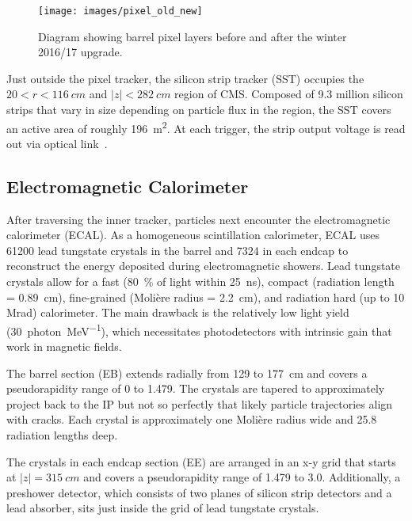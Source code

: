 \documentclass[12pt]{article}
\begin{document}
        \noindent \begin{figure}[htbp] \begin{center}
            \texttt{[image: images/pixel\_old\_new]}
            \caption{Diagram showing barrel pixel layers before and after the winter 2016/17 upgrade.~\cite{pixel_old_new}}
            \label{pixel_old_new}
        \end{center} \end{figure}
        
        Just outside the pixel tracker, the silicon strip tracker (SST) occupies the $\num{20} < r < \SI{116}{cm}$ and $\lvert z \rvert < \SI{282}{cm}$ region of CMS. Composed of \num{9.3} million silicon strips that vary in size  depending on particle flux in the region, the SST covers an active area of roughly \SI{196}{m^2}. At each trigger, the strip output voltage is read out via optical link~\cite{cms_pixel_upgrade}.

    \subsection{Electromagnetic Calorimeter}
        After traversing the inner tracker, particles next encounter the electromagnetic calorimeter (ECAL). As a homogeneous scintillation calorimeter, ECAL uses \num{61200} lead tungstate crystals in the barrel and \num{7324} in each endcap to reconstruct the energy deposited during electromagnetic showers. Lead tungstate crystals allow for a fast (\SI{80}{\percent} of light within \SI{25}{\nano\s}), compact (radiation length = \SI{0.89}{cm}), fine-grained (Moli\`ere radius = \SI{2.2}{cm}), and radiation hard (up to 10 Mrad) calorimeter. The main drawback is the relatively low light yield (\SI{30}{photon\per\mega\electronvolt}), which necessitates photodetectors with intrinsic gain that work in magnetic fields\cite{cms_experiment, cms_tdr}.

        The barrel section (EB) extends radially from \num{129} to \SI{177}{cm} and covers a pseudorapidity range of \num{0} to \num{1.479}. The crystals are tapered to approximately project back to the IP but not so perfectly that likely particle trajectories align with cracks. Each crystal is approximately one Moli\`ere radius wide and 25.8 radiation lengths deep.

        The crystals in each endcap section (EE) are arranged in an x-y grid that starts at $\lvert z \rvert = \SI{315}{cm}$ and covers a pseudorapidity range of \num{1.479} to \num{3.0}. Additionally, a preshower detector, which consists of two planes of silicon strip detectors and a lead absorber, sits just inside the grid of lead tungstate crystals. 
\end{document}
